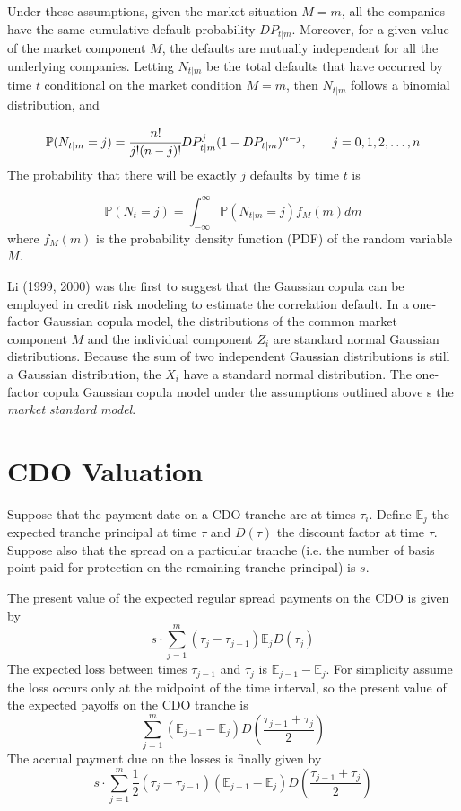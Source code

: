 Under these assumptions, given the market situation $M = m$, all the companies
have the same cumulative default probability $DP_{t|m}$. Moreover, for a
given value of the market component $M$, the defaults are mutually independent for
all the underlying companies. Letting $N_{t|m}$ be the total defaults that have occurred
by time $t$ conditional on the market condition $M = m$, then $N_{t|m}$ follows a binomial
distribution, and

\[\mathbb{P}(N_{t|m} = j) = \cfrac{n!}{j!(n-j)!}DP^j_{t|m}(1-DP_{t|m})^{n-j},\qquad  j=0, 1, 2,\ldots,n\]
The probability that there will be exactly $j$ defaults by time $t$ is

\[\mathbb{P}(N_{t} = j) = \int_{-\infty}^{\infty}{\mathbb{P}(N_{t|m} = j)f_M(m)dm}\]
where $f_M(m)$ is the probability density function (PDF) of the random variable $M$.

Li (1999, 2000) was the first to suggest that the Gaussian copula can be employed
in credit risk modeling to estimate the correlation default. In a one-factor Gaussian
copula model, the distributions of the common market component $M$ and the individual component $Z_i$
are standard normal Gaussian distributions.
Because the sum of two independent Gaussian distributions is still a Gaussian distribution, the $X_i$
have a standard normal distribution.
The one-factor copula Gaussian copula model under the assumptions outlined above s the \emph{market standard model}.

\section{CDO Valuation}
Suppose that the payment date on a CDO tranche are at times $\tau_i$. Define $\mathbb{E}_j$ the expected 
tranche principal at time $\tau$ and $D(\tau)$ the discount factor at time $\tau$. Suppose also that the spread
on a particular tranche (i.e. the number of basis point paid for protection on the remaining tranche principal) is $s$. 

The present value of the expected regular spread payments on the CDO is given by
\begin{equation}
s\cdot \sum_{j=1}^{m}(\tau_j - \tau_{j-1})\mathbb{E}_{j}D(\tau_j)
\label{eq:A}
\end{equation}
The expected loss between times $\tau_{j-1}$ and $\tau_j$ is $\mathbb{E}_{j-1}-\mathbb{E}_j$. For simplicity assume
the loss occurs only at the midpoint of the time interval, so the present value of the expected payoffs on the CDO tranche is
\begin{equation}
\sum_{j=1}^{m}(\mathbb{E}_{j-1}-\mathbb{E}_j)D\left(\frac{\tau_{j-1}+\tau_j}{2}\right)
\label{eq:C}
\end{equation}
The accrual payment due on the losses is finally given by
\begin{equation}
s\cdot\sum_{j=1}^{m}\frac{1}{2}(\tau_j - \tau_{j-1})(\mathbb{E}_{j-1}-\mathbb{E}_j)D(\frac{\tau_{j-1}+\tau_j}{2})
\label{eq:B}
\end{equation}

